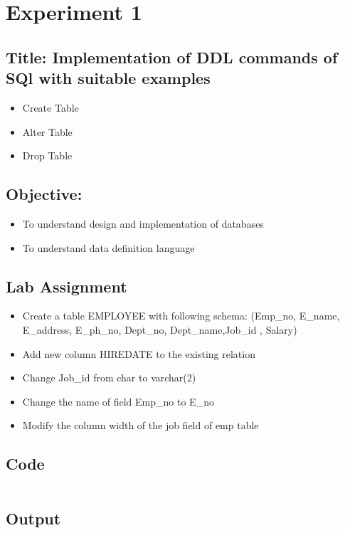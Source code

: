 \documentclass{article}
\begin{document}
\section*{Experiment 1}
\subsection*{\textbf{Title:} Implementation of DDL commands of SQl with suitable examples}
\begin{itemize}
	\item Create Table
	\item Alter Table
	\item Drop Table
\end{itemize}
\subsection*{\textbf{Objective:}}
\begin{itemize}
	\item To understand design and implementation of databases
	\item To understand data definition language
\end{itemize}
\subsection*{Lab Assignment}
\begin{itemize}
	\item Create a table EMPLOYEE with following schema: (Emp_no, E_name, E_address, E_ph_no, Dept_no, Dept_name,Job_id , Salary)
	\item Add new column HIREDATE to the existing relation
	\item Change Job_id from char to varchar(2)
	\item Change the name of field Emp_no to E_no
	\item Modify the column width of the job field of emp table
\end{itemize}
\subsection*{Code}
\inputminted{sql}{code/1.sql}
\subsection*{Output}

\end{document}
